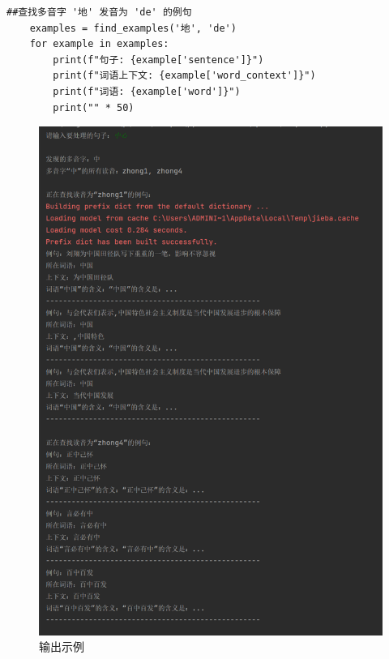 \documentclass[12pt,hyperref,a4paper,UTF8]{ctexart}
\begin{document}
\begin{lstlisting}[caption={示例代码}, label={lst:example}]
    ##查找多音字 '地' 发音为 'de' 的例句
    examples = find_examples('地', 'de')
    for example in examples:
        print(f"句子: {example['sentence']}")
        print(f"词语上下文: {example['word_context']}")
        print(f"词语: {example['word']}")
        print("" * 50)
    \end{lstlisting}

    \begin{figure}
        \centering
        \includegraphics[width=0.9\linewidth]{figures/image9.png}
        \caption{输出示例}
        \label{fig:ente}
    \end{figure}
\end{document}
